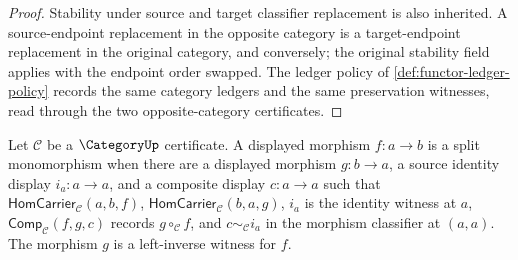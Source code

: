 \begin{proof}
Stability under source and target classifier replacement is also inherited.
A source-endpoint replacement in the opposite category is a target-endpoint
replacement in the original category, and conversely; the original stability
field applies with the endpoint order swapped. The ledger policy of
\autoref{def:functor-ledger-policy} records the same category ledgers and the
same preservation witnesses, read through the two opposite-category
certificates.
\end{proof}

\begin{definition}
\label{def:category-split-monomorphism}
Let $\mathcal C$ be a $\CategoryUp$ certificate. A displayed morphism
$f:a\to b$ is a split monomorphism when there are a displayed morphism
$g:b\to a$, a source identity display $i_a:a\to a$, and a composite display
$c:a\to a$ such that $\mathsf{HomCarrier}_{\mathcal C}(a,b,f)$,
$\mathsf{HomCarrier}_{\mathcal C}(b,a,g)$, $i_a$ is the identity witness at
$a$, $\mathsf{Comp}_{\mathcal C}(f,g,c)$ records $g\circ_{\mathcal C} f$,
and $c\sim_{\mathcal C} i_a$ in the morphism classifier at $(a,a)$. The
morphism $g$ is a left-inverse witness for $f$.
\end{definition}

